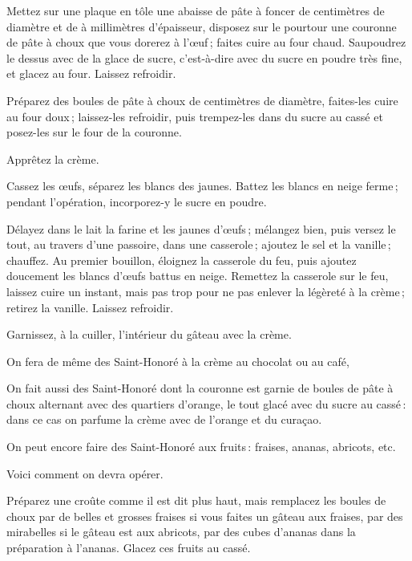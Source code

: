 Mettez sur une plaque en tôle une abaisse de pâte à foncer de {\mmm}
centimètres de diamètre et de {\mmm} à {\mmm} millimètres
d'épaisseur, disposez sur le pourtour une couronne de pâte à choux que vous
dorerez à l'œuf ; faites cuire au four chaud. Saupoudrez le dessus avec de la
glace de sucre, c’est-à-dire avec du sucre en poudre très fine, et glacez au
four. Laissez refroidir.

Préparez des boules de pâte à choux de {\mmm} centimètres de diamètre,
faites-les cuire au four doux ; laissez-les refroidir, puis trempez-les dans du
sucre au cassé et posez-les sur le four de la couronne.

Apprêtez la crème.

Cassez les œufs, séparez les blancs des jaunes. Battez les blancs en neige
ferme ; pendant l'opération, incorporez-y le sucre en poudre.

Délayez dans le lait la farine et les jaunes d'œufs ; mélangez bien, puis
versez le tout, au travers d'une passoire, dans une casserole ; ajoutez le sel
et la vanille ; chauffez. Au premier bouillon, éloignez la casserole du feu,
puis ajoutez doucement les blancs d'œufs battus en neige. Remettez la casserole
sur le feu, laissez cuire un instant, mais pas trop pour ne pas enlever la
légèreté à la crème ; retirez la vanille. Laissez refroidir.

Garnissez, à la cuiller, l'intérieur du gâteau avec la crème.

\sk

On fera de même des Saint-Honoré à la crème au chocolat ou au café,

\sk

On fait aussi des Saint-Honoré dont la couronne est garnie de boules de pâte
à choux alternant avec des quartiers d'orange, le tout glacé avec du sucre au
cassé : dans ce cas on parfume la crème avec de l'orange et du curaçao.

\sk

On peut encore faire des Saint-Honoré aux fruits : fraises, ananas, abricots,
etc.

Voici comment on devra opérer.

Préparez une croûte comme il est dit plus haut, mais remplacez les boules de
choux par de belles et grosses fraises si vous faites un gâteau aux fraises,
par des mirabelles si le gâteau est aux abricots, par des cubes d’ananas dans
la préparation à l'ananas. Glacez ces fruits au cassé.

